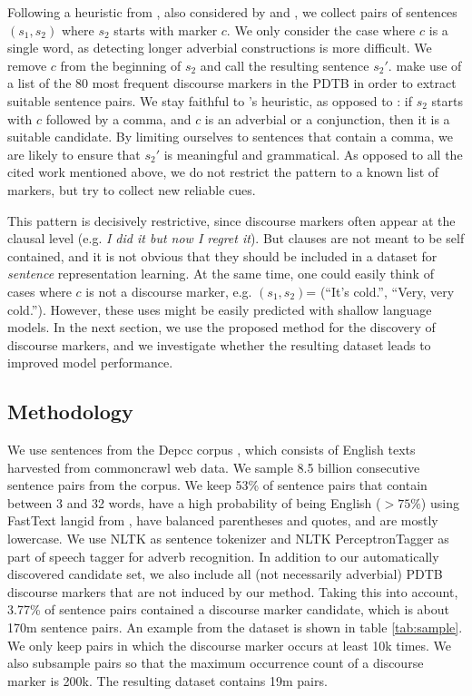 \documentclass[11pt,a4paper]{article}
\begin{document}
Following a heuristic from \citet{RutherfordX15}, also considered by \citet{Malmi2018} and \citet{Jernite2017}, we collect pairs of sentences $(s_1, s_2)$ where $s_2$ starts with marker $c$. We only consider the case where $c$ is a single word, as detecting longer adverbial constructions is more difficult. We remove $c$  from the beginning of $s_2$ and call the resulting sentence $s_2'$. 
\citet{Malmi2018}  make use of a list of the 80 most frequent discourse markers in the PDTB in order to extract suitable sentence pairs.
We stay faithful to \citet{RutherfordX15}'s heuristic, as opposed to 
\citet{Malmi2018,Jernite2017}: if $s_2$ starts with $c$ followed by a comma, and $c$ is an adverbial or a conjunction, then it is a suitable candidate. By limiting ourselves to sentences that contain a comma, we are likely to ensure that $s_2'$ is meaningful and grammatical. As opposed to all the cited work mentioned above, we do not restrict the pattern to a known list of markers, but try to collect new reliable cues. 

This pattern is decisively restrictive, since discourse markers often appear at the clausal level (e.g. \textit{I did it but now I regret it}).
But clauses are not meant to be self contained, and it is not obvious that they should be included in a dataset for \textit{sentence} representation learning. At the same time, one could easily think of cases where $c$ is not a discourse marker, e.g. $(s_1, s_2)$= (``It's cold.'', ``Very, very cold.''). However, these uses might be easily predicted with shallow language models.
In the next section, we use the proposed method for the discovery of discourse markers, and we investigate whether the resulting dataset leads to improved model performance.


\subsection{Methodology}

We use sentences from the Depcc corpus \citep{Panchenko2017}, which consists of English texts harvested from commoncrawl web data. We sample 8.5 billion consecutive sentence pairs from the corpus.
We keep 53\% of sentence pairs that contain between 3 and 32 words, have a high probability of being English ($>75\%$) using FastText langid from \citet{GRAVE18.627}, have balanced parentheses and quotes, and are mostly lowercase. 
We use NLTK \citep{Bird2009} as sentence tokenizer and NLTK PerceptronTagger as part of speech tagger for adverb recognition.
In addition to our automatically discovered candidate set, we also include all (not necessarily adverbial) PDTB discourse markers that are not induced by our method. Taking this into account, 3.77\% of sentence pairs contained a discourse marker candidate, which is about 170{\sc m} sentence pairs. 
An example from the dataset is shown in table \ref{tab:sample}.
We only keep pairs in which the discourse marker occurs at least 10{\sc k} times. We also subsample pairs so that the maximum occurrence count of a discourse marker is 200{\sc k}.  The resulting dataset contains 19{\sc m} pairs. 
\end{document}
